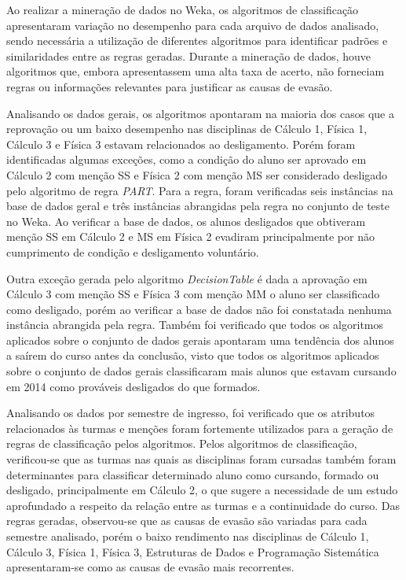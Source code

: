 Ao realizar a mineração de dados no Weka, os algoritmos de classificação apresentaram variação no desempenho para cada arquivo de dados analisado, sendo necessária a utilização de diferentes algoritmos para identificar padrões e similaridades entre as regras geradas. Durante a mineração de dados, houve algoritmos que, embora apresentassem uma alta taxa de acerto, não forneciam regras ou informações relevantes para justificar as causas de evasão.

Analisando os dados gerais, os algoritmos apontaram na maioria dos casos que a reprovação ou um baixo desempenho nas disciplinas de Cálculo 1, Física 1, Cálculo 3 e Física 3 estavam relacionados ao desligamento. Porém foram identificadas algumas exceções, como a condição do aluno ser aprovado em Cálculo 2 com menção SS e Física 2 com menção MS ser considerado desligado pelo algoritmo de regra \textit{PART}. Para a regra, foram verificadas seis instâncias na base de dados geral e três instâncias abrangidas pela regra no conjunto de teste no Weka. Ao verificar a base de dados, os alunos desligados que obtiveram menção SS em Cálculo 2 e MS em Física 2 evadiram principalmente por não cumprimento de condição e desligamento voluntário.

 Outra exceção gerada pelo algoritmo \textit{DecisionTable} é dada a aprovação em Cálculo 3 com menção SS e Física 3 com menção MM o aluno ser classificado como desligado, porém ao verificar a base de dados não foi constatada nenhuma instância abrangida pela regra. Também foi verificado que todos os algoritmos aplicados sobre o conjunto de dados gerais apontaram uma tendência dos alunos a saírem do curso antes da conclusão, visto que todos os algoritmos aplicados sobre o conjunto de dados gerais classificaram mais alunos que estavam cursando em 2014 como prováveis desligados do que formados.

Analisando os dados por semestre de ingresso, foi verificado que os atributos relacionados às turmas e menções foram fortemente utilizados para a geração de regras de classificação pelos algoritmos. Pelos algoritmos de classificação, verificou-se que as turmas nas quais as disciplinas foram cursadas também foram determinantes para classificar determinado aluno como cursando, formado ou desligado, principalmente em Cálculo 2, o que sugere a necessidade de um estudo aprofundado a respeito da relação entre as turmas e a continuidade do curso.  Das regras geradas, observou-se que as causas de evasão são variadas para cada semestre analisado, porém o baixo rendimento nas disciplinas de Cálculo 1, Cálculo 3, Física 1, Física 3, Estruturas de Dados e Programação Sistemática apresentaram-se como as causas de evasão mais recorrentes. 

